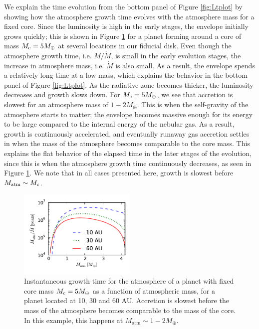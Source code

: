 \documentclass[apj]{emulateapj}
\begin{document}
 
We explain the time evolution from the bottom panel of Figure \ref{fig:Ltplot} by showing how the atmosphere growth time evolves with the atmosphere mass for a fixed core. Since the luminosity is high in the early stages, the envelope initially grows quickly; this is shown in Figure \ref{fig:growthtime} for a planet forming around a core of mass $M_{\rm c}=5 M_{\oplus}$ at several locations in our fiducial disk. Even though the atmosphere growth time, i.e. $M/\dot{M}$, is small in the early evolution stages, the increase in atmosphere mass, i.e. $\dot{M}$ is also small. As a result, the envelope spends a relatively long time at a low mass, which explains the behavior in the bottom panel of Figure \ref{fig:Ltplot}. As the radiative zone becomes thicker, the luminosity decreases and growth slows down. For $M_{\rm c}=5 M_{\oplus}$, we see that accretion is slowest for an atmosphere mass of $1-2 M_{\oplus}$. This is when the self-gravity of the atmosphere starts to matter; the envelope becomes massive enough for its energy to be large compared to the internal energy of the nebular gas. As a result, growth is continuously accelerated, and eventually runaway gas accretion settles in when the mass of the atmosphere becomes comparable to the core mass. This explains the flat behavior of the elapsed time in the later stages of the evolution, since this is when the atmosphere growth time continuously decreases, as seen in Figure \ref{fig:growthtime}. We note that in all cases presented here, growth is slowest before $M_{\rm{atm}} \sim M_{\rm c}$.  %
 
\begin{figure}[h]
\centering
\includegraphics[width=0.5\textwidth]{../../figs/ModelAtmospheres/RadSelfGravPoly/PaperFigs/Mt_profile.pdf}
\caption{Instantaneous growth time for the atmosphere of a planet with fixed core mass $M_{\rm c}=5 M_{\oplus}$ as a function of atmospheric mass, for a planet located at 10, 30 and 60 AU. Accretion is slowest before the mass of the atmosphere becomes comparable to the mass of the core. In this example, this happens at $M_{\mathrm{atm}} \sim 1-2 M_{\oplus}$.}
\label{fig:growthtime}
\end{figure}
\end{document}
